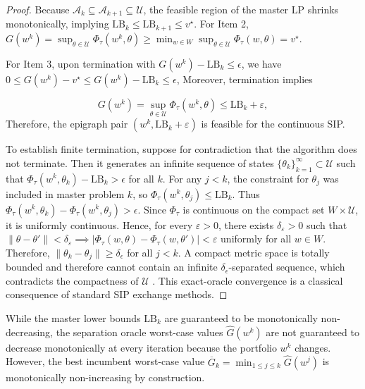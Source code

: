 \documentclass[smallextended]{svjour3}
\begin{document}
\begin{proof}
Because $\mathcal{A}_k \subseteq \mathcal{A}_{k+1} \subseteq \mathcal{U}$, the feasible region of the master LP shrinks monotonically, implying $\mathrm{LB}_k \le \mathrm{LB}_{k+1} \le v^\star$. For Item 2, $G(w^k) = \sup_{\theta \in \mathcal{U}} \Phi_\tau(w^k, \theta) \ge \min_{w \in W} \sup_{\theta \in \mathcal{U}} \Phi_\tau(w, \theta) = v^\star$.

For Item 3, upon termination with $G(w^k) - \mathrm{LB}_k \le \epsilon$, we have $0 \le G(w^k) - v^\star \le G(w^k) - \mathrm{LB}_k \le \epsilon$, Moreover, termination implies

\[
G(w^k) = \sup_{\theta\in\mathcal U}\Phi_\tau(w^k,\theta)
\le
\mathrm{LB}_k+\varepsilon,
\]
Therefore, the epigraph pair $(w^k,\mathrm{LB}_k+\varepsilon)$ is feasible for the
continuous SIP.

To establish finite termination, suppose for contradiction that the algorithm does not terminate. Then it generates an infinite sequence of states $\{\theta_k\}_{k=1}^\infty \subset \mathcal{U}$ such that $\Phi_\tau(w^k, \theta_k) - \mathrm{LB}_k > \epsilon$ for all $k$. For any $j < k$, the constraint for $\theta_j$ was included in master problem $k$, so $\Phi_\tau(w^k, \theta_j) \le \mathrm{LB}_k$. Thus $\Phi_\tau(w^k, \theta_k) - \Phi_\tau(w^k, \theta_j) > \epsilon$. Since $\Phi_\tau$ is continuous on the compact set $W\times \mathcal{U}$, it is uniformly continuous. Hence, for every $\varepsilon>0$, there exists $\delta_\varepsilon>0$ such that $\|\theta-\theta'\|<\delta_\varepsilon \implies |\Phi_\tau(w,\theta)-\Phi_\tau(w,\theta')|<\varepsilon$ uniformly for all $w\in W$. Therefore, $\|\theta_k - \theta_j\| \ge \delta_\epsilon$ for all $j < k$. A compact metric space is totally bounded and therefore cannot contain an infinite $\delta_\epsilon$-separated sequence, which contradicts the compactness of $\mathcal{U}$ \citep{hettich1993semi, lopez2007semi}. This exact-oracle convergence is a classical consequence of standard SIP exchange methods.
\end{proof}

\begin{remark}
While the master lower bounds $\mathrm{LB}_k$ are guaranteed to be monotonically non-decreasing, the separation oracle worst-case values $\widehat{G}(w^k)$ are not guaranteed to decrease monotonically at every iteration because the portfolio $w^k$ changes. However, the best incumbent worst-case value $\overline{G}_k = \min_{1 \le j \le k} \widehat{G}(w^j)$ is monotonically non-increasing by construction.
\end{remark}
\end{document}
